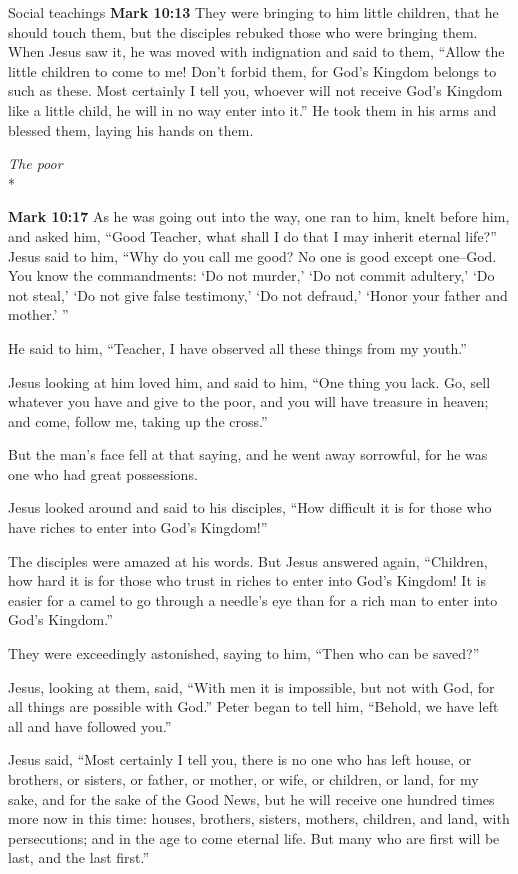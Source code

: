 \documentclass[10pt,twoside]{article} %
\newcommand{\quotesize}{\normalsize{}}
\newenvironment{quotetext}{\begingroup\quotesize}{\endgroup}
\newcommand{\intex}[1]{\index[texts]{#1}}
\newcommand{\bible}[2]{\begin{quotetext}\textbf{#1}\intex{#1} #2\end{quotetext}}
\newcommand{\gospelmark}[2]{\bible{Mark #1}{#2}}
\newcommand{\subhead}[1]{\emph{#1}\\*}
\begin{document}
\begin{section}{Social teachings}
\gospelmark{10:13}{
They were bringing to him little children, that he should touch them, but the disciples rebuked those who were bringing them.   
When Jesus saw it, he was moved with indignation and said to them, ``Allow the little children to come to me! Don't forbid them, for God's Kingdom belongs to such as these.    Most certainly I tell you, whoever will not receive God's Kingdom like a little child, he will in no way enter into it.''   He took them in his arms and blessed them, laying his hands on them.
}

\subhead{The poor}

\gospelmark{10:17}{
As he was going out into the way, one ran to him, knelt before him, and asked him, ``Good Teacher, what shall I do that I may inherit eternal life?''
  Jesus said to him, ``Why do you call me good? No one is good except one--God.    You know the commandments: `Do not murder,' `Do not commit adultery,' `Do not steal,' `Do not give false testimony,' `Do not defraud,' `Honor your father and mother.' ''

  He said to him, ``Teacher, I have observed all these things from my youth.''

  Jesus looking at him loved him, and said to him, ``One thing you lack. Go, sell whatever you have and give to the poor, and you will have treasure in heaven; and come, follow me, taking up the cross.''

  But the man's face fell at that saying, and he went away sorrowful, for he was one who had great possessions.

  Jesus looked around and said to his disciples, ``How difficult it is for those who have riches to enter into God's Kingdom!''

  The disciples were amazed at his words. But Jesus answered again, ``Children, how hard it is for those who trust in riches to enter into God's Kingdom!    It is easier for a camel to go through a needle's eye than for a rich man to enter into God's Kingdom.''

  They were exceedingly astonished, saying to him, ``Then who can be saved?''

  Jesus, looking at them, said, ``With men it is impossible, but not with God, for all things are possible with God.'' 
 Peter began to tell him, ``Behold, we have left all and have followed you.''

  Jesus said, ``Most certainly I tell you, there is no one who has left house, or brothers, or sisters, or father, or mother, or wife, or children, or land, for my sake, and for the sake of the Good News,    but he will receive one hundred times more now in this time: houses, brothers, sisters, mothers, children, and land, with persecutions; and in the age to come eternal life.    But many who are first will be last, and the last first.'' }

\end{section}
\end{document}

